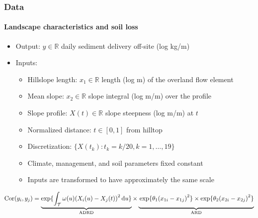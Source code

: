 \documentclass{snedecorbeamer}
\begin{document}
\begin{frame}
  \frametitle{Data}
  \framesubtitle{Landscape characteristics and soil loss}

  \begin{itemize}
  \item Output: $y\in\mathbb{R}$ daily sediment delivery off-site (log kg/m)
  \item Inputs:
    \begin{itemize}
    \item Hillslope length: $x_1\in\mathbb{R}$ length (log m) of the overland flow
      element
    \item Mean slope: $x_2\in\mathbb{R}$ slope integral (log m/m) over the profile
    \item Slope profile: $X(t)\in\mathbb{R}$ slope steepness (log m/m) at $t$
    \item Normalized distance: $t\in[0, 1]$ from hilltop
    \item Discretization: $\{X(t_k) : t_k = k / 20, k = 1, \dots, 19\}$
    \item Climate, management, and soil parameters fixed constant
    \item Inputs are transformed to have approximately the same scale
    \end{itemize}
  \end{itemize}

  \vfill

  $\mathrm{Cor}(y_i, y_j) =
  \underbrace{\exp\{
    \int_\mathcal{T}
    \omega(u){(X_i(u) - X_j(t))}^2\,\mathrm{d}u\}
  }_{\mathrm{ADRD}}
  \times
  \underbrace{
    \vphantom{\int_\mathcal{T}}
      \exp\{\theta_1 {(x_{1i} - x_{1j})}^2\}
  \times
  \exp\{\theta_2 {(x_{2i} - x_{2j})}^2\}
  }_{\mathrm{ARD}}$
\end{frame}
\end{document}
